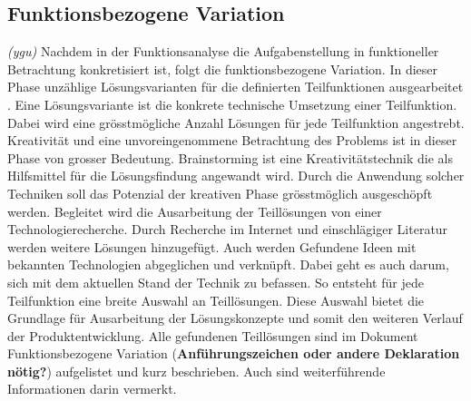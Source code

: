 \subsection{Funktionsbezogene Variation}
\label{funktionsbez_var}
\textit{(ygu)} Nachdem in der Funktionsanalyse die Aufgabenstellung in funktioneller Betrachtung konkretisiert ist, folgt die funktionsbezogene Variation. In dieser Phase unzählige Lösungsvarianten für die definierten Teilfunktionen ausgearbeitet \cite{pahl}. Eine Lösungsvariante ist die konkrete technische Umsetzung einer Teilfunktion. Dabei wird eine grösstmögliche Anzahl Lösungen für jede Teilfunktion angestrebt. 
\newline
Kreativität und eine unvoreingenommene Betrachtung des Problems ist in dieser Phase von grosser Bedeutung. Brainstorming ist eine Kreativitätstechnik die als Hilfsmittel für die Lösungsfindung angewandt wird. Durch die Anwendung solcher Techniken soll das Potenzial der kreativen Phase grösstmöglich ausgeschöpft werden.
\newline
Begleitet wird die Ausarbeitung der Teillösungen von einer Technologierecherche. Durch Recherche im Internet und einschlägiger Literatur werden weitere Lösungen hinzugefügt. Auch werden Gefundene Ideen mit bekannten Technologien abgeglichen und verknüpft. Dabei geht es auch darum, sich mit dem aktuellen Stand der Technik zu befassen. 
\newline
So entsteht für jede Teilfunktion eine breite Auswahl an Teillösungen. Diese Auswahl bietet die Grundlage für Ausarbeitung der Lösungskonzepte und somit den weiteren Verlauf der Produktentwicklung. Alle gefundenen Teillösungen sind im Dokument Funktionsbezogene Variation (\textbf{Anführungszeichen oder andere Deklaration nötig?}) aufgelistet und kurz beschrieben. Auch sind weiterführende Informationen darin vermerkt.
